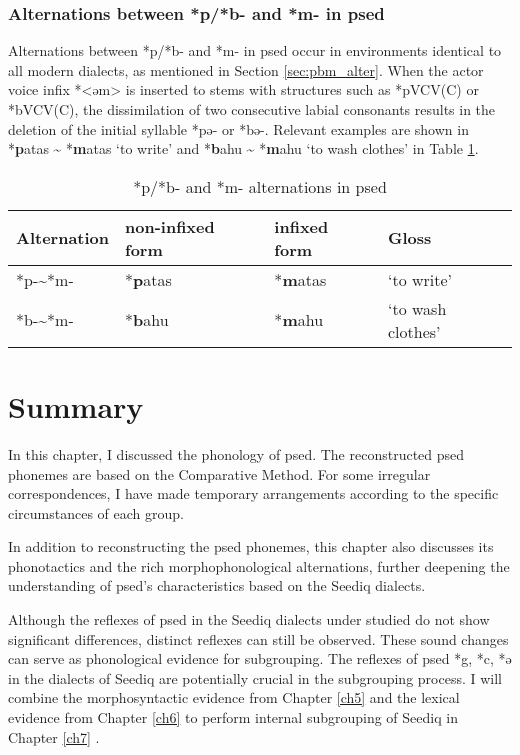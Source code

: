 \subsubsection{Alternations between *p/*b- and *m- in \acl{psed}}

Alternations between *p/*b- and *m- in \acl{psed} occur in environments identical to all modern dialects, as mentioned in Section \ref{sec:pbm_alter}. When the actor voice infix *<əm> is inserted to stems with structures such as *pVCV(C) or *bVCV(C), the dissimilation of two consecutive labial consonants results in the deletion of the initial syllable *pə- or *bə-. Relevant examples are shown in *\textbf{p}atas \~{} *\textbf{m}atas `to write' and *\textbf{b}ahu \~{} *\textbf{m}ahu `to wash clothes' in Table \ref{tab:psed_bp2m}.

\begin{table}[!htbp]
\centering
\caption{*p/*b- and *m- alternations in \acl{psed}}
\label{tab:psed_bp2m}
\begin{tabular}{llll}
\hline
Alternation  & non-infixed form  & infixed form & Gloss                   \\ \hline
*p-\~{ }*m-  & *\textbf{p}atas & *\textbf{m}atas   & `to write'               \\
*b-\~{ }*m-  & *\textbf{b}ahu  & *\textbf{m}ahu     & `to wash clothes' \\ \hline
\end{tabular}
\end{table}

\section{Summary}

In this chapter, I discussed the phonology of \acl{psed}. The reconstructed \acl{psed} phonemes are based on the Comparative Method. For some irregular correspondences, I have made temporary arrangements according to the specific circumstances of each group.

In addition to reconstructing the \acl{psed} phonemes, this chapter also discusses its phonotactics and the rich morphophonological alternations, further deepening the understanding of \acl{psed}'s characteristics based on the Seediq dialects.

Although the reflexes of \acl{psed} in the Seediq dialects under studied do not show significant differences, distinct reflexes can still be observed. These sound changes can serve as phonological evidence for subgrouping. The reflexes of \acl{psed} *g, *c, *ə in the dialects of Seediq are potentially crucial in the subgrouping process. I will combine the morphosyntactic evidence from Chapter \ref{ch5} and the lexical evidence from Chapter \ref{ch6} to perform internal subgrouping of Seediq in Chapter \ref{ch7} .